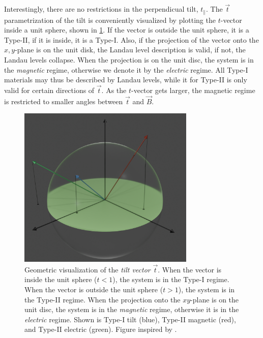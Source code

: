 Interestingly, there are no restrictions in the perpendicual tilt, \( t_\parallel \).
The \( \vec{t} \) parametrization of the tilt is conveniently visualized by plotting the \( t \)-vector inside a unit sphere, shown in \cref{fig:tiltSphere}.
If the vector is outside the unit sphere, it is a Type-II, if it is inside, it is a Type-I.
Also, if the projection of the vector onto the \(x,y\)-plane is on the unit disk, the Landau level description is valid, if not, the Landau levels collapse.
When the projection is on the unit disc, the system is in the \emph{magnetic} regime, otherwise we denote it by the \emph{electric} regime.
All Type-I materials may thus be described by Landau levels, while it for Type-II is only valid for certain directions of \(\vec{t}\).
As the \(t\)-vector gets larger, the magnetic regime is restricted to smaller angles between \( \vec{t} \) and \( \vec{B} \).
\begin{figure}[ht]
  \centering
  \includegraphics[width=0.75\textwidth]{figures/tiltSpherewBackground.png}
  \caption{Geometric visualization of the \emph{tilt vector} \( \vec{t} \).
    When the vector is inside the unit sphere (\( t < 1 \)), the system is in the Type-I regime.
    When the vector is outside the unit sphere (\( t > 1 \)), the system is in the Type-II regime.
    When the projection onto the \( xy \)-plane is on the unit disc, the system is in the \emph{magnetic} regime, otherwise it is in the \emph{electric} regime.
    Shown is Type-I tilt (blue), Type-II magnetic (red), and Type-II electric (green).
    Figure inspired by \textcite{tchoumakovMagneticFieldInducedRelativisticProperties2016}.
\label{fig:tiltSphere}
  }
\end{figure}

